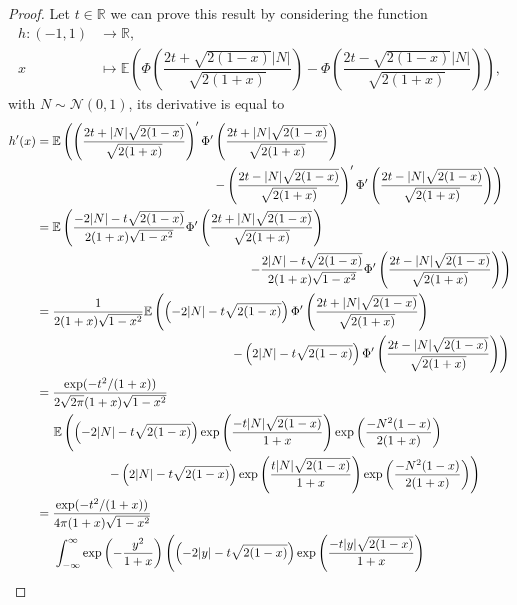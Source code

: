 \documentclass[12pt]{article}
\theoremstyle{Theorem}
\begin{document}
\begin{proof}
Let $t \in \mathbb{R}$ we can prove this result by considering  the function \begin{align*} 
h: (-1,1) &\longrightarrow \mathbb{R}, \\
x & \longmapsto \mathbb{E}\left(\Phi\left(\dfrac{2t + \sqrt{2(1-x)}|N|}{\sqrt{2(1+x)}}\right) - \Phi\left(\dfrac{2t - \sqrt{2(1-x)}|N|}{\sqrt{2(1+x)}}\right)\right),
\end{align*}
with $N \sim \mathcal{N}\left(0,1\right)$, its derivative is equal to 
\begin{align*}
h'(x) & = \mathbb{E}\left( \left(\frac{2t + |N|\sqrt{2(1-x)}}{\sqrt{2(1+x)}}\right)'\Phi'\left(\frac{2t + |N|\sqrt{2(1-x)}}{\sqrt{2(1+x)}}\right)\right. \\
& \hspace{5cm} \left. - \left(\frac{2t - |N|\sqrt{2(1-x)}}{\sqrt{2(1+x)}}\right)'\Phi'\left(\frac{2t - |N|\sqrt{2(1-x)}}{\sqrt{2(1+x)}}\right) \right)\\
& = \mathbb{E}\left(\frac{-2|N| -t\sqrt{2(1-x)}}{2(1+x)\sqrt{1-x^2}}\Phi'\left(\frac{2t + |N|\sqrt{2(1-x)}}{\sqrt{2(1+x)}}\right) \right. \\
& \hspace{6cm}  \left. - \frac{2|N| - t\sqrt{2(1-x)}}{2(1+x)\sqrt{1-x^2}}\Phi'\left(\frac{2t - |N|\sqrt{2(1-x)}}{\sqrt{2(1+x)}}\right) \right) \\
& = \frac{1}{2(1+x)\sqrt{1-x^2}}\mathbb{E}\left(\left(-2|N| -t\sqrt{2(1-x)}\right)\Phi'\left(\frac{2t + |N|\sqrt{2(1-x)}}{\sqrt{2(1+x)}}\right) \right. \\
& \hspace{5.5cm}  \left. - \left(2|N| - t\sqrt{2(1-x)}\right)\Phi'\left(\frac{2t - |N|\sqrt{2(1-x)}}{\sqrt{2(1+x)}}\right) \right) \\
& = \frac{\exp(-t^2/(1+x))}{2\sqrt{2\pi}(1+x)\sqrt{1-x^2}}\\
&\hspace{0.5cm} \mathbb{E}\left(\left(-2|N| -t\sqrt{2(1-x)}\right)\exp\left(\frac{-t|N|\sqrt{2(1-x)}}{1+x}\right)\exp\left(\frac{-N^{2}(1-x)}{2(1+x)}\right)\right. \\
&\hspace{2cm}\left. - \left(2|N| - t\sqrt{2(1-x)}\right)\exp\left(\frac{t|N|\sqrt{2(1-x)}}{1+x}\right)\exp\left(\frac{-N^{2}(1-x)}{2(1+x)}\right)\right) \\
& = \frac{\exp(-t^2/(1+x))}{4\pi(1+x)\sqrt{1-x^2}}\\
&\hspace{0.5cm} \int_{-\infty}^{\infty}\exp\left(-\frac{y^2}{1+x}\right)\left(\left(-2|y| -t\sqrt{2(1-x)}\right)\exp\left(\frac{-t|y|\sqrt{2(1-x)}}{1+x}\right)\right. \\

\end{align*}
\end{proof}
\end{document}
